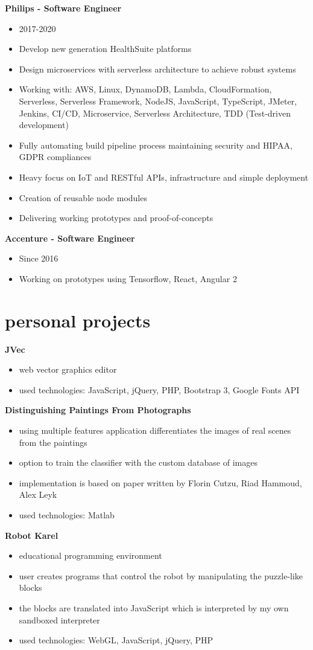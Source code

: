 \documentclass[]{friggeri-cv}
\begin{document}
\textbf{Philips - Software Engineer}
\begin{itemize}
  \item 2017-2020
  \item Develop new generation HealthSuite platforms
  \item Design microservices with serverless architecture to achieve robust systems
  \item Working with: AWS, Linux, DynamoDB, Lambda, CloudFormation, Serverless, Serverless Framework, NodeJS, JavaScript, TypeScript, JMeter, Jenkins, CI/CD, Microservice, Serverless Architecture, TDD (Test-driven development)
  \item Fully automating build pipeline process maintaining security and HIPAA, GDPR compliances
  \item Heavy focus on IoT and RESTful APIs, infrastructure and simple deployment
  \item Creation of reusable node modules
  \item Delivering working prototypes and proof-of-concepts
\end{itemize}

\textbf{Accenture - Software Engineer}
\begin{itemize}
  \item Since 2016
  \item Working on prototypes using Tensorflow, React, Angular 2
\end{itemize}

\section{personal projects}

\textbf{JVec}
\begin{itemize}
  \item web vector graphics editor
  \item used technologies: JavaScript, jQuery, PHP, Bootstrap 3, Google Fonts API
\end{itemize}

\textbf{Distinguishing Paintings From Photographs}
\begin{itemize}
  \item using multiple features application differentiates the images of real scenes from the paintings
  \item option to train the classifier with the custom database of images
  \item implementation is based on paper written by Florin Cutzu, Riad Hammoud, Alex Leyk
  \item used technologies: Matlab
\end{itemize}

\textbf{Robot Karel}
\begin{itemize}
  \item educational programming environment
  \item user creates programs that control the robot by manipulating the puzzle-like blocks
  \item the blocks are translated into JavaScript which is interpreted by my own sandboxed interpreter
  \item used technologies: WebGL, JavaScript, jQuery, PHP
\end{itemize}
\end{document}
